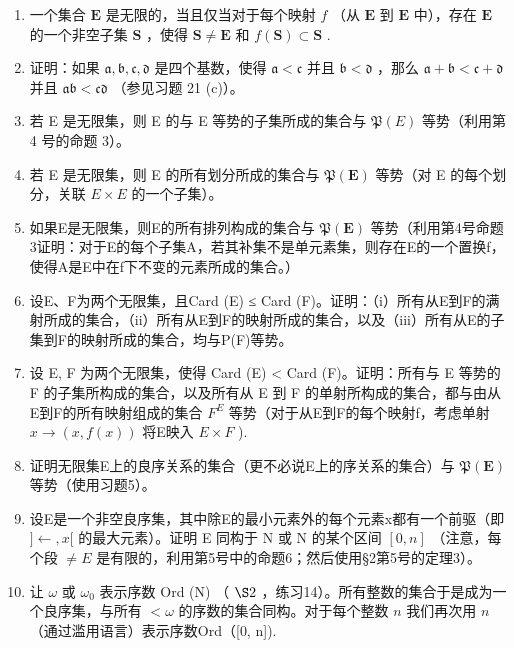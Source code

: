 \exercisegroup

\begin{enumerate}
\def\labelenumi{\arabic{enumi}.}
\item
  一个集合 \(\mathbf{E}\) 是无限的，当且仅当对于每个映射 \(f\) （从 \(\mathbf{E}\) 到 \(\mathbf{E}\) 中），存在 \(\mathbf{E}\) 的一个非空子集 \(\mathbf{S}\) ，使得 \(\mathbf{S} \neq \mathbf{E}\) 和 \(f(\mathbf{S}) \subset \mathbf{S}\) .
\item
  证明：如果 \(\mathfrak{a}, \mathfrak{b}, \mathfrak{c}, \mathfrak{d}\) 是四个基数，使得 \(\mathfrak{a} < \mathfrak{c}\) 并且 \(\mathfrak{b} < \mathfrak{d}\) ，那么 \(\mathfrak{a} + \mathfrak{b} < \mathfrak{c} + \mathfrak{d}\) 并且 \(\mathfrak{a}\mathfrak{b} < \mathfrak{c}\mathfrak{d}\) （参见习题 21 (c)）。
\item
  若 E 是无限集，则 E 的与 E 等势的子集所成的集合与 \(\mathfrak{P}(E)\) 等势（利用第 4 号的命题 3）。
\item
  若 E 是无限集，则 E 的所有划分所成的集合与 \(\mathfrak{P}(\mathbf{E})\) 等势（对 E 的每个划分，关联 \(E \times E\) 的一个子集）。
\item
  如果E是无限集，则E的所有排列构成的集合与 \(\mathfrak{P}(\mathbf{E})\) 等势（利用第4号命题3证明：对于E的每个子集A，若其补集不是单元素集，则存在E的一个置换f，使得A是E中在f下不变的元素所成的集合。）
\item
  设E、F为两个无限集，且Card (E) ≤ Card (F)。证明：（i）所有从E到F的满射所成的集合，（ii）所有从E到F的映射所成的集合，以及（iii）所有从E的子集到F的映射所成的集合，均与P(F)等势。
\item
  设 E, F 为两个无限集，使得 Card (E) \textless{} Card (F)。证明：所有与 E 等势的 F 的子集所构成的集合，以及所有从 E 到 F 的单射所构成的集合，都与由从E到F的所有映射组成的集合 \(F^{E}\) 等势（对于从E到F的每个映射f，考虑单射 \(x \to (x, f(x))\) 将E映入 \(E \times F\) ).
\item
  证明无限集E上的良序关系的集合（更不必说E上的序关系的集合）与 \(\mathfrak{P}(\mathbf{E})\) 等势（使用习题5）。
\item
  设E是一个非空良序集，其中除E的最小元素外的每个元素x都有一个前驱（即 \(] \leftarrow, x[\) 的最大元素）。证明 E 同构于 N 或 N 的某个区间 \([0, n]\) （注意，每个段 \(\neq E\) 是有限的，利用第5号中的命题6；然后使用§2第5号的定理3）。
\item
  让 \(\omega\) 或 \(\omega_0\) 表示序数 Ord (N) （ \(\S 2\) ，练习14）。所有整数的集合于是成为一个良序集，与所有 \(< \omega\) 的序数的集合同构。对于每个整数 \(n\) 我们再次用 \(n\) （通过滥用语言）表示序数Ord（{[}0, n{]}).
\end{enumerate}

